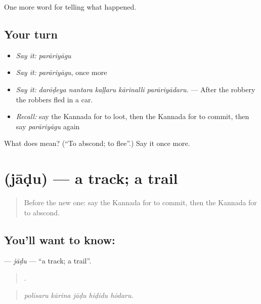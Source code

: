 \begin{grammarlens}[title={What you've built}]
One more word for telling what happened.
\end{grammarlens}

\subsection*{Your turn}
\begin{itemize}
\raggedright
  \item \emph{Say it:} \emph{parāriyāgu}
  \item \emph{Say it:} \emph{parāriyāgu}, once more
  \item \emph{Say it:} \emph{darōḍeya nantara kaḷḷaru kārinalli parāriyādaru.} — After the robbery the robbers fled in a car.
  \item \emph{Recall:} say the Kannada for to loot, then the Kannada for to commit, then say \emph{parāriyāgu} again
\end{itemize}

\begin{tcolorbox}[breakable,colback=teal!4,colframe=teal!35!black,title={Before you move on}]
What does  mean? (\textquotedblleft{}To abscond; to flee\textquotedblright{}.) Say it once more.
\end{tcolorbox}
\section[\texorpdfstring{\kn{ಜಾಡು} (jāḍu)}{ಜಾಡು (jāḍu)}]{ (jāḍu) — a track; a trail}

\label{lesson:KA-C328-jadu}



\begin{quote}
Before the new one: say the Kannada for to commit, then the Kannada for to abscond.
\end{quote}

\subsection*{You'll want to know: }
\textbf{} — \emph{jāḍu} — \textquotedblleft{}a track; a trail\textquotedblright{}.

\begin{quote}
    .
\end{quote}

\begin{quote}
\emph{polīsaru kārina jāḍu hiḍidu hōdaru.}
\end{quote}

